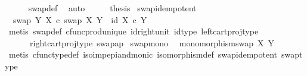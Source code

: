 \begin{isabellebody}
\ \ \ \ \isamarkupfalse%
\ swap{\isacharunderscore}{\kern0pt}def\ \isamarkupfalse%
\ auto\isanewline
\ \ \isamarkupfalse%
\ \isamarkupfalse%
\ {\isacharquery}{\kern0pt}thesis\isacommand{{\isachardot}{\kern0pt}}\isamarkupfalse%
\isanewline
{}\isamarkupfalse%
%
\endisatagproof
{\isafoldproof}%
%
\isadelimproof
\isanewline
%
\endisadelimproof
\isanewline
{}\isamarkupfalse%
\ swap{\isacharunderscore}{\kern0pt}idempotent{\isacharcolon}{\kern0pt}\isanewline
\ \ {\isachardoublequoteopen}swap\ Y\ X\ {\isasymcirc}\isactrlsub c\ swap\ X\ Y\ {\isacharequal}{\kern0pt}\ id\ {\isacharparenleft}{\kern0pt}X\ {\isasymtimes}\isactrlsub c\ Y{\isacharparenright}{\kern0pt}{\isachardoublequoteclose}\isanewline
%
\isadelimproof
\ \ %
\endisadelimproof
%
\isatagproof
{}\isamarkupfalse%
\ {\isacharparenleft}{\kern0pt}metis\ swap{\isacharunderscore}{\kern0pt}def\ cfunc{\isacharunderscore}{\kern0pt}prod{\isacharunderscore}{\kern0pt}unique\ id{\isacharunderscore}{\kern0pt}right{\isacharunderscore}{\kern0pt}unit{}\ id{\isacharunderscore}{\kern0pt}type\ left{\isacharunderscore}{\kern0pt}cart{\isacharunderscore}{\kern0pt}proj{\isacharunderscore}{\kern0pt}type\isanewline
\ \ \ \ \ \ right{\isacharunderscore}{\kern0pt}cart{\isacharunderscore}{\kern0pt}proj{\isacharunderscore}{\kern0pt}type\ swap{\isacharunderscore}{\kern0pt}ap{\isacharparenright}{\kern0pt}%
\endisatagproof
{\isafoldproof}%
%
\isadelimproof
\isanewline
%
\endisadelimproof
\isanewline
{}\isamarkupfalse%
\ swap{\isacharunderscore}{\kern0pt}mono{\isacharcolon}{\kern0pt}\isanewline
\ \ {\isachardoublequoteopen}monomorphism{\isacharparenleft}{\kern0pt}swap\ X\ Y{\isacharparenright}{\kern0pt}{\isachardoublequoteclose}\isanewline
%
\isadelimproof
\ \ %
\endisadelimproof
%
\isatagproof
{}\isamarkupfalse%
\ {\isacharparenleft}{\kern0pt}metis\ cfunc{\isacharunderscore}{\kern0pt}type{\isacharunderscore}{\kern0pt}def\ iso{\isacharunderscore}{\kern0pt}imp{\isacharunderscore}{\kern0pt}epi{\isacharunderscore}{\kern0pt}and{\isacharunderscore}{\kern0pt}monic\ isomorphism{\isacharunderscore}{\kern0pt}def\ swap{\isacharunderscore}{\kern0pt}idempotent\ swap{\isacharunderscore}{\kern0pt}type{\isacharparenright}{\kern0pt}%
\endisatagproof
{\isafoldproof}%
%
\isadelimproof
%
\endisadelimproof
%
\isadelimdocument
%
\endisadelimdocument
%
\isatagdocument
%
\isamarkuptrue%
%
\endisatagdocument
{\isafolddocument}%

\end{isabellebody}
